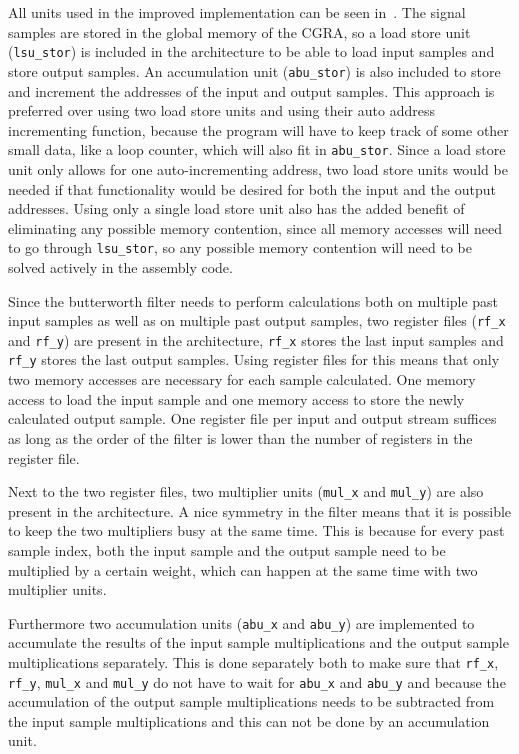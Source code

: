 \documentclass[10pt,twocolumn]{article}
\begin{document}
All units used in the improved implementation can be seen
in~. The signal samples are stored in the
global memory of the CGRA, so a load store unit (\texttt{lsu\_stor})
is included in the architecture to be able to load input samples and
store output samples. An accumulation unit (\texttt{abu\_stor}) is
also included to store and increment the addresses of the input and
output samples. This approach is preferred over using two load store
units and using their auto address incrementing function, because the
program will have to keep track of some other small data, like a loop
counter, which will also fit in \texttt{abu\_stor}. Since a load store
unit only allows for one auto-incrementing address, two load store
units would be needed if that functionality would be desired for both
the input and the output addresses. Using only a single load store
unit also has the added benefit of eliminating any possible memory
contention, since all memory accesses will need to go through
\texttt{lsu\_stor}, so any possible memory contention will need to be
solved actively in the assembly code.

Since the butterworth filter needs to perform calculations both on
multiple past input samples as well as on multiple past output
samples, two register files (\texttt{rf\_x} and \texttt{rf\_y}) are
present in the architecture, \texttt{rf\_x} stores the last input
samples and \texttt{rf\_y} stores the last output samples. Using
register files for this means that only two memory accesses are
necessary for each sample calculated. One memory access to load the
input sample and one memory access to store the newly calculated
output sample. One register file per input and output stream suffices
as long as the order of the filter is lower than the number of
registers in the register file.

Next to the two register files, two multiplier units (\texttt{mul\_x}
and \texttt{mul\_y}) are also present in the architecture. A nice
symmetry in the filter means that it is possible to keep the two
multipliers busy at the same time. This is because for every past
sample index, both the input sample and the output sample need to be
multiplied by a certain weight, which can happen at the same time with
two multiplier units.

Furthermore two accumulation units (\texttt{abu\_x} and
\texttt{abu\_y}) are implemented to accumulate the results of the
input sample multiplications and the output sample multiplications
separately. This is done separately both to make sure that
\texttt{rf\_x}, \texttt{rf\_y}, \texttt{mul\_x} and \texttt{mul\_y} do
not have to wait for \texttt{abu\_x} and \texttt{abu\_y} and because
the accumulation of the output sample multiplications needs to be
subtracted from the input sample multiplications and this can not be
done by an accumulation unit.
\end{document}

